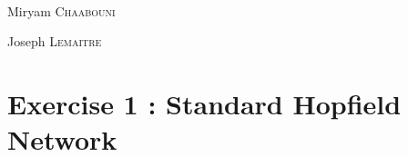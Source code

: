 \begin{titlepage}
\HRule \\[1.5cm]


\begin{flushright}
\large Miryam \textsc{Chaabouni}

\large Joseph \textsc{Lemaitre}\\ %

\end{flushright}





\vfill %

\end{titlepage}

\section{Exercise 1 : Standard Hopfield Network }
